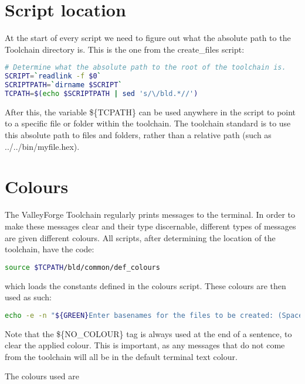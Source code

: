 \documentclass[a4paper, oneside, 11pt, titlepage, onecolumn, openright]{report}
\begin{document}
\section{Script location}
			\label{s:ScriptLocation}
			At the start of every script we need to figure out what the absolute path to the Toolchain directory is. This is the one from the create\_files script:
			
\begin{lstlisting}[frame=trBL, breaklines=true, language = bash]
# Determine what the absolute path to the root of the toolchain is.
SCRIPT=`readlink -f $0`
SCRIPTPATH=`dirname $SCRIPT`
TCPATH=$(echo $SCRIPTPATH | sed 's/\/bld.*//')
\end{lstlisting}
After this, the variable \$\{TCPATH\} can be used anywhere in the script to point to a specific file or folder within the toolchain. The toolchain standard is to use this absolute path to files and folders, rather than a relative path (such as ../../bin/myfile.hex).
			
\section{Colours}
			\label{s:Colours}
			The ValleyForge Toolchain regularly prints messages to the terminal. In order to make these messages clear and their type discernable, different types of messages are given different colours. All scripts, after determining the location of the toolchain, have the code:

\begin{lstlisting}[frame=trBL, breaklines=true, language = bash]
source $TCPATH/bld/common/def_colours

\end{lstlisting}			
			
which loads the constants defined in the colours script. These colours are then used as such:

\begin{lstlisting}[frame=trBL, breaklines=true, language = bash]
echo -e -n "${GREEN}Enter basenames for the files to be created: (Space separated) ${NO_COLOUR}"
\end{lstlisting}					
			
			Note that the \$\{NO\_COLOUR\} tag is always used at the end of a sentence, to clear the applied colour. This is important, as any messages that do not come from the toolchain will all be in the default terminal text colour.
			
			The colours used are
			
\end{document}
